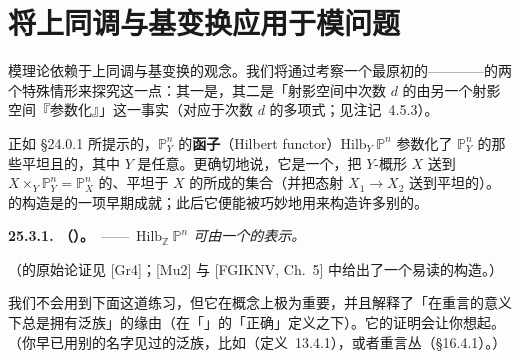 
\section{将上同调与基变换应用于模问题}

模理论依赖于上同调与基变换的观念。我们将通过考察一个最原初的\trModuliSpace——\trHilbertScheme——的两个特殊情形来探究这一点：其一是\trGrassmannian，其二是「射影空间中次数 $d$ 的\trHypersurface{}由另一个射影空间『参数化』」这一事实（对应于次数 $d$ 的多项式；见\mbox{注记~4.5.3}）。

正如 \S24.0.1 所提示的，$\mathbb{P}^n_Y$ 的\textbf{\trHilbert{}函子}（Hilbert functor）$\mathrm{Hilb}_Y\ \mathbb{P}^n$ 参数化了 $\mathbb{P}^n_Y$ 的那些平坦且\trFinitelyPresented{}的\trClosedSubscheme，其中 $Y$ 是任意\trScheme。更确切地说，它是一个\trContravariantFunctor，把 $Y$-概形 $X$ 送到 $X\times_Y\mathbb{P}^n_Y=\mathbb{P}^n_X$ 的、平坦于 $X$ 的\trFinitelyPresented\trClosedSubscheme{}所成的集合（并把态射 $X_1\to X_2$ 送到平坦\trFamily{}的\trPullback）。\trHilbertScheme{}的构造是\trGrothendieck{}的一项早期成就；此后它便能被巧妙地用来构造许多别的\trModuliSpace。

\textbf{25.3.1. \trhTheorem（\trGrothendieck）。}\ ——\ \emph{$\mathrm{Hilb}_{\mathbb{Z}}\ \mathbb{P}^n$ 可由一个\trLocally\trFiniteType{}的\trScheme{}表示。}

（\trGrothendieck{}的原始论证见 [Gr4]；[Mu2] 与 [FGIKNV, Ch.~5] 中给出了一个易读的构造。）

我们不会用到下面这道练习，但它在概念上极为重要，并且解释了「\trModuliSpace{}在重言的意义下总是拥有泛族」的缘由（在「\trModuliSpace{}」的「正确」定义之下）。它的证明会让你想起\trYonedaLemma。（你早已用别的名字见过\trModuliSpace{}的泛族，比如\trUniversalHyperplane（\mbox{定义~13.4.1}），或者重言丛（\S16.4.1）。）

